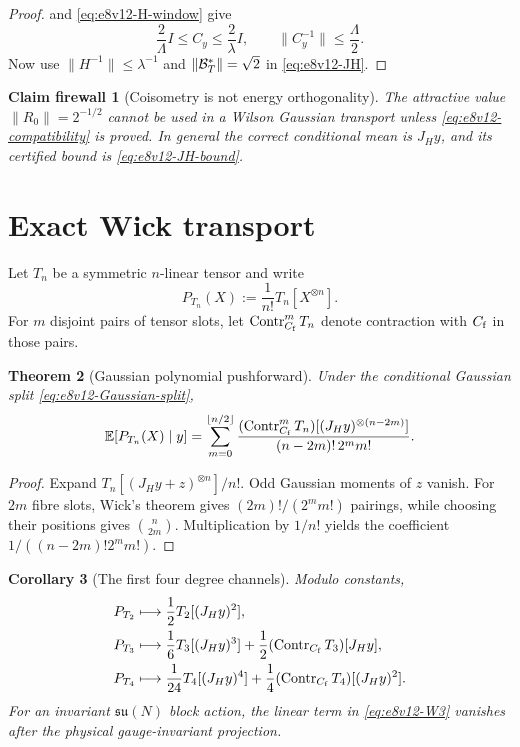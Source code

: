 \documentclass[11pt,oneside]{book}
\newtheorem{theorem}{Theorem}[chapter]
\newtheorem{corollary}[theorem]{Corollary}
\newtheorem{firewall}[theorem]{Claim firewall}
\theoremstyle{definition}
\theoremstyle{remark}
\begin{document}
\begin{proof}
 and
\eqref{eq:e8v12-H-window} give
\[
 \frac2\Lambda I\le C_y\le\frac2\lambda I,
 \qquad \|C_y^{-1}\|\le\frac\Lambda2.
\]
Now use \(\|H^{-1}\|\le\lambda^{-1}\) and
\(\|{\cal B}_T^*\|=\sqrt2\) in \eqref{eq:e8v12-JH}.
\end{proof}

\begin{firewall}[Coisometry is not energy orthogonality]
\label{fire:e8v12-two-lifts}
The attractive value \(\|R_0\|=2^{-1/2}\) cannot be used in a Wilson
Gaussian transport unless \eqref{eq:e8v12-compatibility} is proved.
In general the correct conditional mean is \(J_Hy\), and its certified
bound is \eqref{eq:e8v12-JH-bound}.
\end{firewall}

\section{Exact Wick transport}
\label{sec:e8v12-Wick}

Let \(T_n\) be a symmetric \(n\)-linear tensor and write
\[
 P_{T_n}(X):=\frac1{n!}T_n[X^{\otimes n}].           \label{eq:e8v12-PT}
\]
For \(m\) disjoint pairs of tensor slots, let
\(\operatorname{Contr}_{C_{\rm f}}^mT_n\) denote contraction with
\(C_{\rm f}\) in those pairs.

\begin{theorem}[Gaussian polynomial pushforward]
\label{thm:e8v12-Wick}
Under the conditional Gaussian split
\eqref{eq:e8v12-Gaussian-split},
\[
 \mathbb E\!\left[P_{T_n}(X)\mid y\right]
 =
 \sum_{m=0}^{\lfloor n/2\rfloor}
 \frac{
 (\operatorname{Contr}_{C_{\rm f}}^mT_n)
 [(J_Hy)^{\otimes(n-2m)}]}
 {(n-2m)!\,2^m m!}.                                 \label{eq:e8v12-Wick}
\]
\end{theorem}

\begin{proof}
Expand \(T_n[(J_Hy+z)^{\otimes n}]/n!\).  Odd Gaussian moments of
\(z\) vanish.  For \(2m\) fibre slots, Wick's theorem gives
\((2m)!/(2^mm!)\) pairings, while choosing their positions gives
\(\binom n{2m}\).  Multiplication by \(1/n!\) yields the coefficient
\(1/((n-2m)!2^mm!)\).
\end{proof}

\begin{corollary}[The first four degree channels]
\label{cor:e8v12-low-degrees}
Modulo constants,
\begin{align}
 P_{T_2}&\longmapsto
 \frac12T_2[(J_Hy)^2],                              \label{eq:e8v12-W2}\\
 P_{T_3}&\longmapsto
 \frac16T_3[(J_Hy)^3]
 +\frac12(\operatorname{Contr}_{C_{\rm f}}T_3)[J_Hy],
                                                               \label{eq:e8v12-W3}\\
 P_{T_4}&\longmapsto
 \frac1{24}T_4[(J_Hy)^4]
 +\frac14(\operatorname{Contr}_{C_{\rm f}}T_4)
          [(J_Hy)^2].                              \label{eq:e8v12-W4}
\end{align}
For an invariant \(\mathfrak{su}(N)\) block action, the linear term in
\eqref{eq:e8v12-W3} vanishes after the physical gauge-invariant
projection.
\end{corollary}
\end{document}
